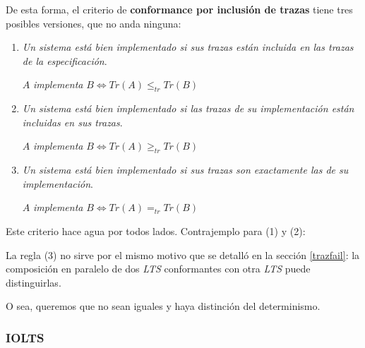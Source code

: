 \documentclass[]{article}
\begin{document}
De esta forma, el criterio de \textbf{conformance por inclusión de trazas} tiene tres posibles versiones, que no anda ninguna:
\begin{enumerate}
	\item \textit{Un sistema está bien implementado si sus trazas están incluida en las trazas de la especificación}.
	\begin{center}
		$A$ \textit{implementa} $B \Leftrightarrow Tr(A) \leq_{tr} Tr(B)$
	\end{center}

	\item \textit{Un sistema está bien implementado si las trazas de su implementación están incluidas en sus trazas}.
	\begin{center}
		$A$ \textit{implementa} $B \Leftrightarrow Tr(A) \geq_{tr} Tr(B)$
	\end{center}

	\item \textit{Un sistema está bien implementado si sus trazas son exactamente las de su implementación}.
	\begin{center}
		$A$ \textit{implementa} $B \Leftrightarrow Tr(A) =_{tr} Tr(B)$
	\end{center}

\end{enumerate}

Este criterio hace agua por todos lados. Contrajemplo para (1) y (2):

La regla (3) no sirve por el mismo motivo que se detalló en la sección \ref{trazfail}: la composición en paralelo de dos \textit{LTS} conformantes con otra \textit{LTS} puede distinguirlas.


O sea, queremos que no sean iguales y haya distinción del determinismo.

\subsubsection{IOLTS}

\end{document}
